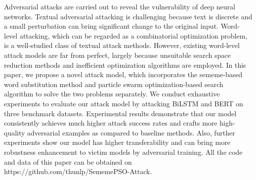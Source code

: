 Adversarial attacks are carried out to reveal the vulnerability of deep neural networks. Textual adversarial attacking is challenging because text is discrete and a small perturbation can bring significant change to the original input. Word-level attacking, which can be regarded as a combinatorial optimization problem, is a well-studied class of textual attack methods. However, existing word-level attack models are far from perfect, largely because unsuitable search space reduction methods and inefficient optimization algorithms are employed. In this paper, we propose a novel attack model, which incorporates the sememe-based word substitution method and particle swarm optimization-based search algorithm to solve the two problems separately. We conduct exhaustive experiments to evaluate our attack model by attacking BiLSTM and BERT on three benchmark datasets. Experimental results demonstrate that our model consistently achieves much higher attack success rates and crafts more high-quality adversarial examples as compared to baseline methods. Also, further experiments show our model has higher transferability and can bring more robustness enhancement to victim models by adversarial training. All the code and data of this paper can be obtained on https://github.com/thunlp/SememePSO-Attack.
